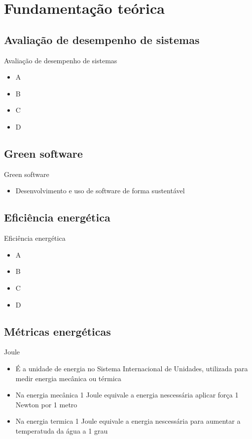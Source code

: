 \section{Fundamentação teórica}

\subsection{Avaliação de desempenho de sistemas}
\begin{frame}{Avaliação de desempenho de sistemas}
    \begin{itemize}
        \item A
        \item B
        \item C 
        \item D 
    \end{itemize}
\end{frame}

\subsection{Green software}
\begin{frame}{Green software}
    \begin{itemize}
        \item Desenvolvimento e uso de software de forma sustentável

    \end{itemize}
\end{frame}

\subsection{Eficiência energética}
\begin{frame}{Eficiência energética}
    \begin{itemize}
        \item A
        \item B
        \item C 
        \item D 
    \end{itemize}
\end{frame}

\subsection{Métricas energéticas}

\begin{frame}{Joule}
    \begin{itemize}
        \item É a unidade de energia no Sistema Internacional de Unidades, utilizada para medir energia mecânica ou térmica
        \item Na energia mecânica 1 Joule equivale a energia nescessária aplicar força 1 Newton por 1 metro
        \item Na energia termica 1 Joule equivale a energia nescessária para aumentar a temperatuda da água a 1 grau
    \end{itemize}

\end{frame}

